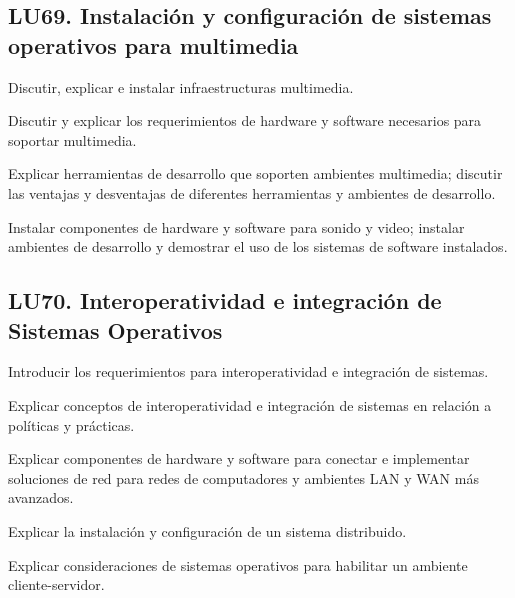 \subsection{LU69. Instalación y configuración de sistemas operativos para multimedia}\label{sec:BOK-LU69}\label{sec:LU69}
\begin{LearningUnit}
\begin{LUGoal}
\item Discutir, explicar e instalar infraestructuras multimedia.
\end{LUGoal}

\begin{LUObjective}
\item Discutir y explicar los requerimientos de hardware y software necesarios para soportar multimedia.
\item Explicar herramientas de desarrollo que soporten ambientes multimedia; discutir las ventajas y desventajas de diferentes herramientas y ambientes de desarrollo.
\item Instalar componentes de hardware y software para sonido y video; instalar ambientes de desarrollo y demostrar el uso de los sistemas de software instalados.
\end{LUObjective}
\end{LearningUnit}

\subsection{LU70. Interoperatividad e integración de Sistemas Operativos}\label{sec:BOK-LU70}\label{sec:LU70}
\begin{LearningUnit}
\begin{LUGoal}
\item Introducir los requerimientos para interoperatividad e integración de sistemas.
\end{LUGoal}

\begin{LUObjective}
\item Explicar conceptos de interoperatividad e integración de sistemas en relación a políticas y prácticas.
\item Explicar componentes de hardware y software para conectar e implementar soluciones de red para redes de computadores y ambientes LAN y WAN más avanzados.
\item Explicar la instalación y configuración de un sistema distribuido.
\item Explicar consideraciones de sistemas operativos para habilitar un ambiente cliente-servidor.
\end{LUObjective}
\end{LearningUnit}

